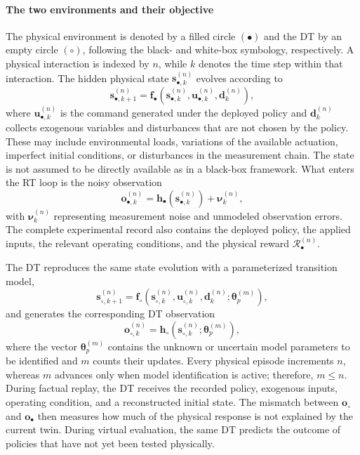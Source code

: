 \documentclass[journal]{IEEEtran}
\begin{document}
\paragraph*{The two environments and their objective}
The physical environment is denoted by a filled circle $(\bullet)$ and the DT by an empty circle $(\circ)$, following the black- and white-box symbology, respectively. A physical interaction is indexed by $n$, while $k$ denotes the time step within that interaction. The hidden physical state $\mathbf s_{\bullet,k}^{(n)}$ evolves according to
\begin{equation}
\mathbf s_{\bullet,k+1}^{(n)}=
\mathbf f_{\bullet}\!\left(
\mathbf s_{\bullet,k}^{(n)},
\mathbf u_{\bullet,k}^{(n)},
\mathbf d_k^{(n)}
\right),
\label{eq:rt-physical-state}
\end{equation}
where $\mathbf u_{\bullet,k}^{(n)}$ is the command generated under the deployed policy and $\mathbf d_k^{(n)}$ collects exogenous variables and disturbances that are not chosen by the policy. These may include environmental loads, variations of the available actuation, imperfect initial conditions, or disturbances in the measurement chain. The state is not assumed to be directly available as in a black-box framework. What enters the RT loop is the noisy observation
\begin{equation}
\mathbf o_{\bullet,k}^{(n)}=
\mathbf h_{\bullet}\!\left(\mathbf s_{\bullet,k}^{(n)}\right)
+\boldsymbol{\nu}_{k}^{(n)},
\label{eq:rt-physical-observation}
\end{equation}
with $\boldsymbol{\nu}_{k}^{(n)}$ representing measurement noise and unmodeled observation errors. The complete experimental record also contains the deployed policy, the applied inputs, the relevant operating conditions, and the physical reward $\mathcal R_{\bullet}^{(n)}$.

The DT reproduces the same state evolution with a parameterized transition model,
\begin{equation}
\mathbf s_{\circ,k+1}^{(n)}=
\mathbf f_{\circ}\!\left(
\mathbf s_{\circ,k}^{(n)},
\mathbf u_{\circ,k}^{(n)},
\mathbf d_k^{(n)};
\boldsymbol{\theta}_{p}^{(m)}
\right),
\label{eq:rt-digital-state}
\end{equation}
and generates the corresponding DT observation
\begin{equation}
\mathbf o_{\circ,k}^{(n)}=
\mathbf h_{\circ}\!\left(
\mathbf s_{\circ,k}^{(n)};
\boldsymbol{\theta}_{p}^{(m)}
\right),
\label{eq:rt-digital-observation}
\end{equation}
where the vector $\boldsymbol{\theta}_{p}^{(m)}$ contains the unknown or uncertain model parameters to be identified and $m$ counts their updates. Every physical episode increments $n$, whereas $m$ advances only when model identification is active; therefore, $m \le n$. During factual replay, the DT receives the recorded policy, exogenous inputs, operating condition, and a reconstructed initial state. The mismatch between $\mathbf o_{\circ}$ and $\mathbf o_{\bullet}$
then measures how much of the physical response is not explained by the current twin. During virtual evaluation, the same DT predicts the outcome of policies that have not yet been tested physically.
\end{document}
